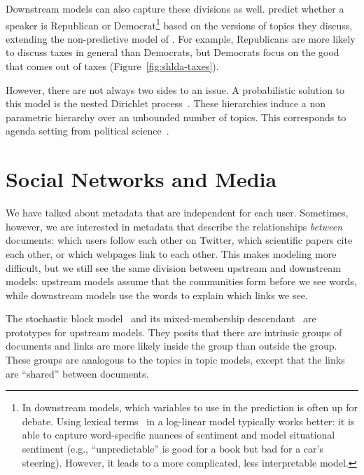 Downstream models can also capture these divisions as well.
\citet{nguyen-13:shlda} predict whether a speaker is Republican or
Democrat\footnote{In downstream models, which variables to use in the
  prediction is often up for debate.  Using lexical
  terms~\citep{titov-08,zhao-10} in a log-linear model typically works
  better: it is able to capture word-specific nuances of sentiment and
  model situational sentiment (e.g., ``unpredictable'' is good for a
  book but bad for a car's steering).  However, it leads to a more
  complicated, less interpretable model.} based on the versions of
topics they discuss, extending the non-predictive model of
\citet{grimmer-09}.  For example, Republicans are more likely to
discuss taxes in general than Democrats, but Democrats focus on the
good that comes out of taxes (Figure~\ref{fig:shlda-taxes}).


However, there are not always two sides to an issue.  A probabilistic
solution to this model is the nested Dirichlet
process~\citep{blei-07}.  These hierarchies induce a non parametric
hierarchy over an unbounded number of topics.  This corresponds to
agenda setting from political
science~\citep{Nguyen:Boyd-Graber:Resnik:Miler-2015}.



\section{Social Networks and Media}

We have talked about metadata that are independent for each user.
Sometimes, however, we are interested in metadata that describe the
relationships \emph{between} documents: which users follow each other
on Twitter, which scientific papers cite each other, or which webpages
link to each other.  This makes modeling more difficult, but we still
see the same division between upstream and downstream models: upstream
models assume that the communities form before we see words, while
downstream models use the words to explain which links we see.

The stochastic block model~\citep{holland-83} and its mixed-membership
descendant~\citep{airoldi-08} are prototypes for upstream models.
They posits that there are intrinsic groups of documents and links are
more likely inside the group than outside the group.  These groups are
analogous to the topics in topic models, except that the links are
``shared'' between documents.

